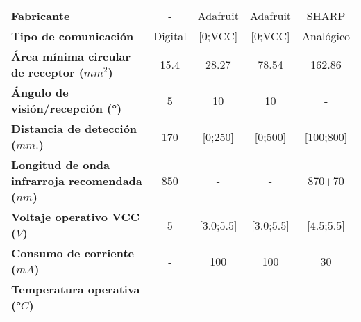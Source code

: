 \begin{mytable}[H]
\begin{tabular}{l|c|c|c|c|}
\begin{minipage}{\mythirdmaxsizeofcontenttable}
		\end{minipage}\\ \hline
		\multicolumn{1}{|l|}{\textbf{Fabricante}} 
		& - & Adafruit & Adafruit & SHARP\\ \hline
		\multicolumn{1}{|l|}{
			\begin{minipage}{\myforthmaxsizeofcontenttable}	
				\textbf{Tipo de comunicación}
			\end{minipage}
		} & Digital & [0;VCC] & [0;VCC] & Analógico         \\ \hline
		\multicolumn{1}{|l|}{
			\begin{minipage}{\myforthmaxsizeofcontenttable}	
				\textbf{Área mínima circular de receptor ($mm^2$)}
			\end{minipage}
		} & 15.4 & 28.27 & 78.54 & 162.86         \\ \hline
		\multicolumn{1}{|l|}{
			\begin{minipage}{\myforthmaxsizeofcontenttable}	
				\textbf{Ángulo de visión/recepción (°)}
			\end{minipage}
		} & 5 & 10 & 10 & -         \\ \hline
		\multicolumn{1}{|l|}{
			\begin{minipage}{\myforthmaxsizeofcontenttable}	
				\textbf{Distancia de detección ($mm.$)}
			\end{minipage}
		} & 170 & [0;250] & [0;500] & [100;800] \\ \hline
		\multicolumn{1}{|l|}{
			\begin{minipage}{\myforthmaxsizeofcontenttable}	
				\textbf{Longitud de onda infrarroja recomendada ($nm$)}
			\end{minipage}
		} & 850 & - & - & 870$\pm$70 \\ \hline
		\multicolumn{1}{|l|}{
			\begin{minipage}{\myforthmaxsizeofcontenttable}	
				\textbf{Voltaje operativo VCC ($V$)}
			\end{minipage}
		} & 5  & [3.0;5.5] & [3.0;5.5] & [4.5;5.5]         \\ \hline
		\multicolumn{1}{|l|}{
			\begin{minipage}{\myforthmaxsizeofcontenttable}	
				\textbf{Consumo de corriente ($mA$)}
			\end{minipage}
		} & -  & 100 & 100 & 30         \\ \hline
		\multicolumn{1}{|l|}{
			\begin{minipage}{\myforthmaxsizeofcontenttable}	
				\textbf{Temperatura operativa (°$C$)}
			\end{minipage}
}
\end{tabular}
\end{mytable}
